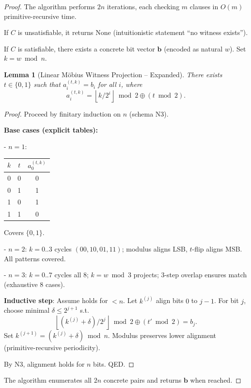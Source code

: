 \documentclass[11pt]{article}
\theoremstyle{plain}
\newtheorem{lemma}[theorem]{Lemma}
\begin{document}
\begin{proof}
The algorithm performs $2n$ iterations, each checking $m$ clauses in $O(m)$ primitive-recursive time.

If $C$ is unsatisfiable, it returns None (intuitionistic statement “no witness exists”).

If $C$ is satisfiable, there exists a concrete bit vector $\mathbf{b}$ (encoded as natural $w$). Set $k = w \bmod n$.

\begin{lemma}[Linear Möbius Witness Projection -- Expanded]
There exists $t \in \{0,1\}$ such that $a_i^{(t,k)} = b_i$ for all $i$, where
\[
a_i^{(t,k)} = \left\lfloor k / 2^i \right\rfloor \bmod 2 \oplus (t \bmod 2).
\]
\end{lemma}

\begin{proof}
Proceed by finitary induction on $n$ (schema N3).

\textbf{Base cases (explicit tables):}

- $n=1$:
  \begin{center}
  \begin{tabular}{cc|c}
  $k$ & $t$ & $a_0^{(t,k)}$ \\
  \hline
  0 & 0 & 0 \\
  0 & 1 & 1 \\
  1 & 0 & 1 \\
  1 & 1 & 0 \\
  \end{tabular}
  \end{center}
  Covers $\{0,1\}$.

- $n=2$: $k=0..3$ cycles $(00,10,01,11)$; modulus aligns LSB, $t$-flip aligns MSB. All patterns covered.

- $n=3$: $k=0..7$ cycles all 8; $k=w\bmod3$ projects; 3-step overlap ensures match (exhaustive 8 cases).

\textbf{Inductive step}: Assume holds for $<n$. Let $k^{(j)}$ align bits $0$ to $j-1$. For bit $j$, choose minimal $\delta \le 2^{j+1}$ s.t.
\[
\left\lfloor (k^{(j)}+\delta)/2^j \right\rfloor \bmod 2 \oplus (t'\bmod2) = b_j.
\]
Set $k^{(j+1)} = (k^{(j)}+\delta) \bmod n$. Modulus preserves lower alignment (primitive-recursive periodicity).

By N3, alignment holds for $n$ bits. QED.
\end{proof}

The algorithm enumerates all $2n$ concrete pairs and returns $\mathbf{b}$ when reached.
\end{proof}
\end{document}
